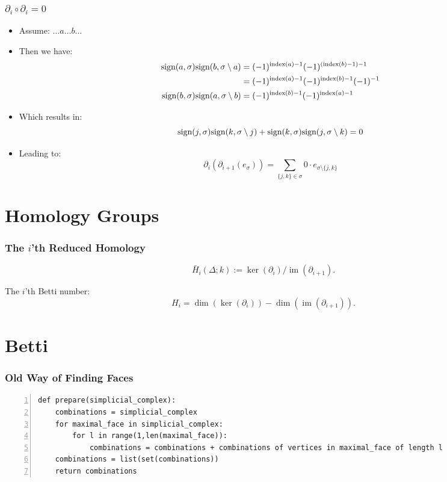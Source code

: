 \documentclass{beamer}
\DeclareMathOperator{\im}{im}
\begin{document}
\begin{frame}
\frametitle{$\partial_{i}\circ \partial_{i}=0$}
\begin{itemize}
\item Assume: $\dots a \dots b \dots$
\item Then we have:
\begin{align*}
\textnormal{sign}(a,\sigma)\textnormal{sign}(b,\sigma\setminus a) &= (-1)^{\textnormal{index}(a)-1}(-1)^{(\textnormal{index}(b)-1)-1}\\
&= (-1)^{\textnormal{index}(a)-1}(-1)^{\textnormal{index}(b)-1}(-1)^{-1}\\
\textnormal{sign}(b,\sigma)\textnormal{sign}(a,\sigma\setminus b) &= (-1)^{\textnormal{index}(b)-1}(-1)^{\textnormal{index}(a)-1}\\
\end{align*} \pause
\item Which results in:
\begin{equation*}
\textnormal{sign}(j,\sigma)\textnormal{sign}(k,\sigma\setminus j) + \textnormal{sign}(k,\sigma)\textnormal{sign}(j,\sigma\setminus k) = 0
\end{equation*}\pause
\item Leading to:
\begin{equation*}
\partial_i(\partial_{i+1}(e_\sigma))=\sum_{\{j,k\}\in\sigma}0\cdot e_{\sigma\setminus\{j,k\}}
\end{equation*}
\end{itemize}
\end{frame}

\section{Homology Groups}
\begin{frame}
\frametitle{The $i$'th Reduced Homology}
\begin{equation*}
\bar{H}_i(\Delta;k):=\ker(\partial_i)/\im(\partial_{i+1}).
\end{equation*}

The $i$'th Betti number:
\begin{equation*}
H_i = \dim(\ker(\partial_i))-\dim(\im(\partial_{i+1})).
\end{equation*}
\end{frame}

\section{Betti}
\begin{frame}[fragile]
\frametitle{Old Way of Finding Faces}
\begin{lstlisting}[numbers=left]
def prepare(simplicial_complex):
    combinations = simplicial_complex
    for maximal_face in simplicial_complex:
        for l in range(1,len(maximal_face)):
            combinations = combinations + combinations of vertices in maximal_face of length l
    combinations = list(set(combinations))
    return combinations
\end{lstlisting}
\end{frame}
\end{document}
